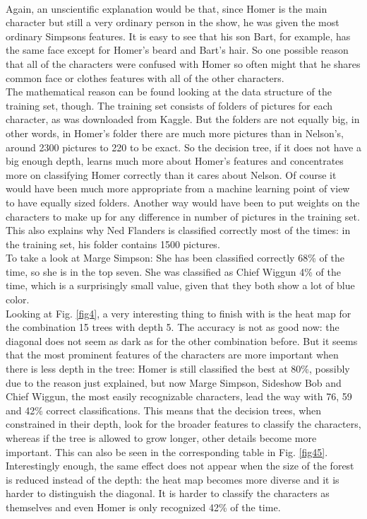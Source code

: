 \documentclass[journal, a4paper]{IEEEtran}
\begin{document}
\\
Again, an unscientific explanation would be that, since Homer is the main character but still a very ordinary person in the show, he was given the most ordinary Simpsons features. It is easy to see that his son Bart, for example, has the same face except for Homer's beard and Bart's hair. So one possible reason that all of the characters were confused with Homer so often might that he shares common face or clothes features with all of the other characters. 
\\
The mathematical reason can be found looking at the data structure of the training set, though. The training set consists of folders of pictures for each character, as was downloaded from Kaggle. But the folders are not equally big, in other words, in Homer's folder there are much more pictures than in Nelson's, around 2300 pictures to 220 to be exact. So the decision tree, if it does not have a big enough depth, learns much more about Homer's features and concentrates more on classifying Homer correctly than it cares about Nelson. Of course it would have been much more appropriate from a machine learning point of view to have equally sized folders. Another way would have been to put weights on the characters to make up for any difference in number of pictures in the training set.
\\
This also explains why Ned Flanders is classified correctly most of the times:  in the training set, his folder contains 1500 pictures. 
\\
To take a look at Marge Simpson: She has been classified correctly 68\% of the time, so she is in the top seven. She was classified as Chief Wiggun 4\% of the time, which is a surprisingly small value, given that they both show a lot of blue color. 
\\
Looking at Fig. \ref{fig4}, a very interesting thing to finish with is the heat map for the combination 15 trees with depth 5. The accuracy is not as good now: the diagonal does not seem as dark as for the other combination before. But it seems that the most prominent features of the characters are more important when there is less depth in the tree: Homer is still classified the best at 80\%, possibly due to the reason just explained, but now Marge Simpson, Sideshow Bob and Chief Wiggun, the most easily recognizable characters, lead the way with 76, 59 and 42\% correct classifications. This means that the decision trees, when constrained in their depth, look for the broader features to classify the characters, whereas if the tree is allowed to grow longer, other details become more important. This can also be seen in the corresponding table in Fig. \ref{fig45}.
\\
Interestingly enough, the same effect does not appear when the size of the forest is reduced instead of the depth: the heat map becomes more diverse and it is harder to distinguish the diagonal. It is harder to classify the characters as themselves and even Homer is only recognized 42\% of the time. 
\end{document}
